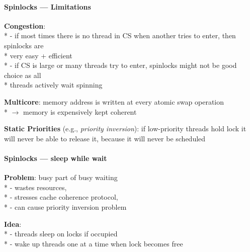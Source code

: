 \paragraph{Spinlocks --- Limitations}
\begin{items}
  \item \textbf{Congestion}: \\*
    - if most times there is no thread in CS when another tries to enter, then spinlocks are \\* \phantom{-} \phantom{\( \cdot \)} very easy + efficient \\*
    - if CS is large or many threads try to enter, spinlocks might not be good choice as all \\* \phantom{-} \phantom{\( \cdot \)} threads actively wait spinning
  \item \textbf{Multicore}: memory address is written at every atomic swap operation \\*
    \( \to \) memory is expensively kept coherent 
  \item \textbf{Static Priorities} (e.g., \emph{priority inversion}): if low-priority threads hold lock it will never be able to release it, because it will never be scheduled
\end{items}

\paragraph{Spinlocks --- sleep while wait}
\begin{items}
  \item \textbf{Problem}: busy part of busy waiting \\*
    - wastes resources, \\*
    - stresses cache coherence protocol, \\*
    - can cause priority inversion problem
  \item \textbf{Idea}: \\*
    - threads sleep on locks if occupied \\*
    - wake up threads one at a time when lock becomes free
\end{items}

